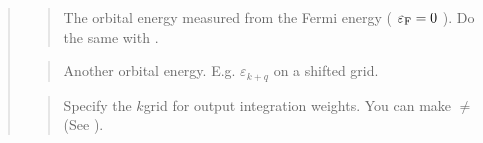 \documentclass[letterpaper,10pt,pdftex,openany,english]{sphinxmanual}
\begin{document}
\begin{quote}
\begin{sphinxVerbatim}[commandchars=\\\{\}]
\end{sphinxVerbatim}
\begin{quote}

\sphinxAtStartPar
The orbital energy measured from the Fermi energy
( \(\varepsilon_{\rm F} = 0\) ).
Do the same with .
\end{quote}

\begin{sphinxVerbatim}[commandchars=\\\{\}]
\end{sphinxVerbatim}
\begin{quote}

\sphinxAtStartPar
Another orbital energy.
E.g. \(\varepsilon_{k + q}\) on a shifted grid.
\end{quote}

\begin{sphinxVerbatim}[commandchars=\\\{\}]
\end{sphinxVerbatim}
\begin{quote}

\sphinxAtStartPar
Specify the \(k\)\sphinxhyphen{}grid for output integration weights.
You can make  \(\neq\)  (See {\hyperref[\detokenize{app:app}]{}}).
\end{quote}

\begin{sphinxVerbatim}[commandchars=\\\{\}]
\end{sphinxVerbatim}
\begin{quote}


\end{quote}
\end{quote}
\end{document}
